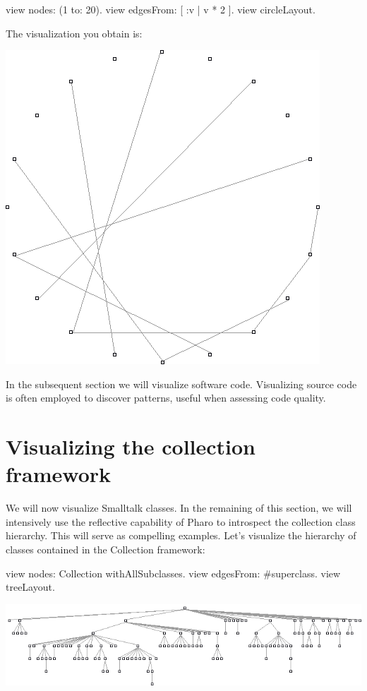 \documentclass[a4paper,10pt,twoside]{book}
\begin{document}
\begin{code}{}
view nodes: (1 to: 20).
view edgesFrom: [ :v | v * 2 ].
view circleLayout.
\end{code}

The visualization you obtain is:

\begin{center}\includegraphics[scale=0.4]{picture3}\end{center}

In the subsequent section we will visualize software code. Visualizing source code is often employed to discover patterns, useful when assessing code quality.


\section{Visualizing the collection framework}

We will now visualize Smalltalk classes. In the remaining of this section, we will intensively use the reflective capability of Pharo to introspect the collection class hierarchy. This will serve as compelling examples. Let's visualize the hierarchy of classes contained in the Collection framework:

\begin{code}{}
view nodes: Collection withAllSubclasses.
view edgesFrom: #superclass.
view treeLayout.
\end{code}
\begin{center}\includegraphics[scale=0.4]{picture4}\end{center}
\end{document}
